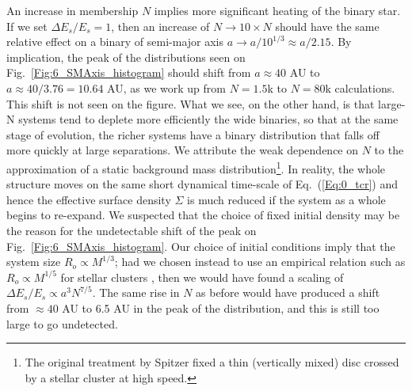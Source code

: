 An increase in membership $N$ implies more significant heating of the binary star. If we set $\Delta E_s/E_s = 1$, then an increase of $N \rightarrow 10 \times N$ should have the same relative effect on a binary of semi-major axis $a \rightarrow a / 10^{1/3} \approx a / 2.15$. 
By implication, the peak of the distributions seen on Fig.~\ref{Fig:6_SMAxis_histogram} should shift from 
$a \approx 40 $ AU to $ a \approx 40 / 3.76 = 10.64 $ AU, as we work up from $N = 1.5$k to $N = 80$k calculations. 
This shift is not seen on the figure. What we see, on the other hand, is that large-N systems tend to deplete more efficiently the wide binaries, so that at the same stage of evolution, the richer systems have a binary distribution that falls off more quickly at large separations. We attribute the weak dependence on $N$ to the approximation of a static background mass distribution\footnote{The original treatment by Spitzer fixed a thin (vertically mixed) disc crossed by a stellar cluster at high speed.}. In reality, the whole structure moves on the same short dynamical time-scale of Eq.~(\ref{Eq:0_tcr}) and hence the effective surface density $\Sigma$ is much reduced if the system as a whole begins to re-expand.  We suspected that the choice of fixed initial density may be the reason for the undetectable shift of the peak on Fig.~\ref{Fig:6_SMAxis_histogram}. Our choice of initial conditions imply that the system size $R_o \propto M^{1/3}$; had we chosen instead to use an empirical relation such as $R_o \propto M^{1/5}$ for stellar clusters \citep{Larsen2004}, then we would have found a scaling of $\Delta E_s /E_s \propto a^3 N^{7/5} $. The same rise in $N$ as before would have produced a shift from $\approx 40$ AU to 6.5 AU in the peak of the distribution, and this is still too large to go undetected. 

